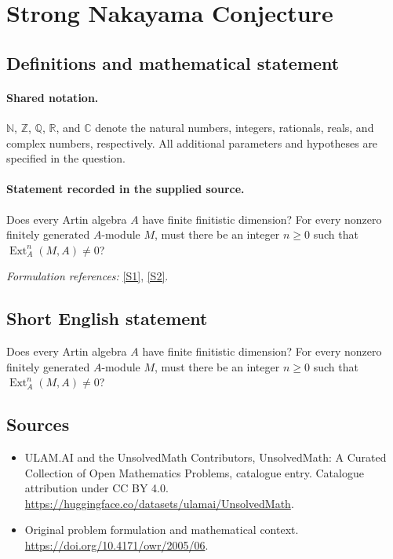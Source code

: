 \documentclass[11pt]{article}
\newcommand{\sref}[2]{\hyperlink{source:#1:#2}{[S#2]}}
\begin{document}
\section{Strong Nakayama Conjecture}\label{statement}

\subsection{Definitions and mathematical statement}

\paragraph{Shared notation.}$\mathbb N$, $\mathbb Z$, $\mathbb Q$, $\mathbb R$, and $\mathbb C$ denote the natural numbers, integers, rationals, reals, and complex numbers, respectively. All additional parameters and hypotheses are specified in the question.


\paragraph{Statement recorded in the supplied source.}
Does every Artin algebra $A$ have finite finitistic dimension? For every nonzero finitely generated $A$-module $M$, must there be an integer $n\geq0$ such that $\operatorname{Ext}_A^n(M,A)\neq0$?
\par\smallskip\textit{Formulation references:} \sref{statement}{1}, \sref{statement}{2}.
\subsection{Short English statement}
Does every Artin algebra $A$ have finite finitistic dimension? For every nonzero finitely generated $A$-module $M$, must there be an integer $n\geq0$ such that $\operatorname{Ext}_A^n(M,A)\neq0$?
\subsection{Sources}
\begin{itemize}
\item[\hypertarget{source:statement:1}{S1}] ULAM.AI and the UnsolvedMath Contributors, UnsolvedMath: A Curated Collection of Open Mathematics Problems, catalogue entry. Catalogue attribution under CC BY 4.0.
\url{https://huggingface.co/datasets/ulamai/UnsolvedMath}.
\item[\hypertarget{source:statement:2}{S2}] Original problem formulation and mathematical context.
\url{https://doi.org/10.4171/owr/2005/06}.
\end{itemize}
\label{end:statement}
\end{document}
